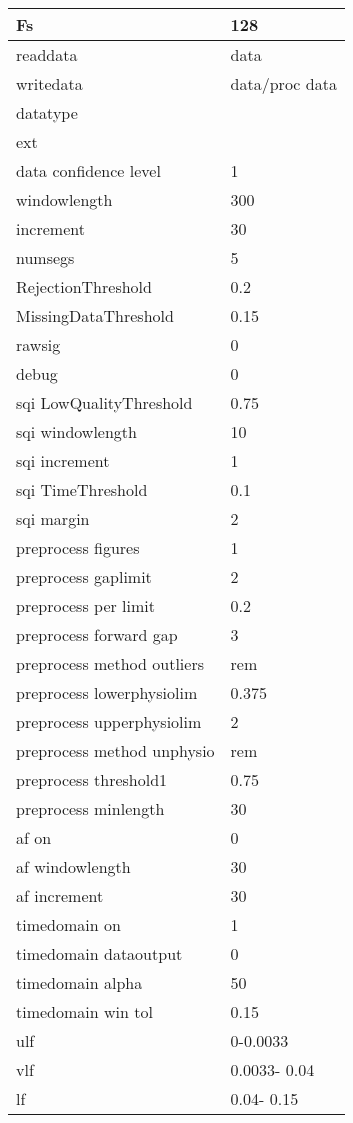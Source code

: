 \begin{tabular}{|l|l|}
\hline
Fs&128\\\hline
readdata&data\\\hline
writedata&data/proc data\\\hline
datatype&\\\hline
ext&\\\hline
data confidence level&1\\\hline
windowlength&300\\\hline
increment&30\\\hline
numsegs&5\\\hline
RejectionThreshold&0.2\\\hline
MissingDataThreshold&0.15\\\hline
rawsig&0\\\hline
debug&0\\\hline
sqi LowQualityThreshold&0.75\\\hline
sqi windowlength&10\\\hline
sqi increment&1\\\hline
sqi TimeThreshold&0.1\\\hline
sqi margin&2\\\hline
preprocess figures&1\\\hline
preprocess gaplimit&2\\\hline
preprocess per limit&0.2\\\hline
preprocess forward gap&3\\\hline
preprocess method outliers&rem\\\hline
preprocess lowerphysiolim&0.375\\\hline
preprocess upperphysiolim&2\\\hline
preprocess method unphysio&rem\\\hline
preprocess threshold1&0.75\\\hline
preprocess minlength&30\\\hline
af on&0\\\hline
af windowlength&30\\\hline
af increment&30\\\hline
timedomain on&1\\\hline
timedomain dataoutput&0\\\hline
timedomain alpha&50\\\hline
timedomain win tol&0.15\\\hline
ulf&     0-0.0033\\\hline
vlf&0.0033-  0.04\\\hline
lf&  0.04-  0.15\\\hline

\end{tabular}
